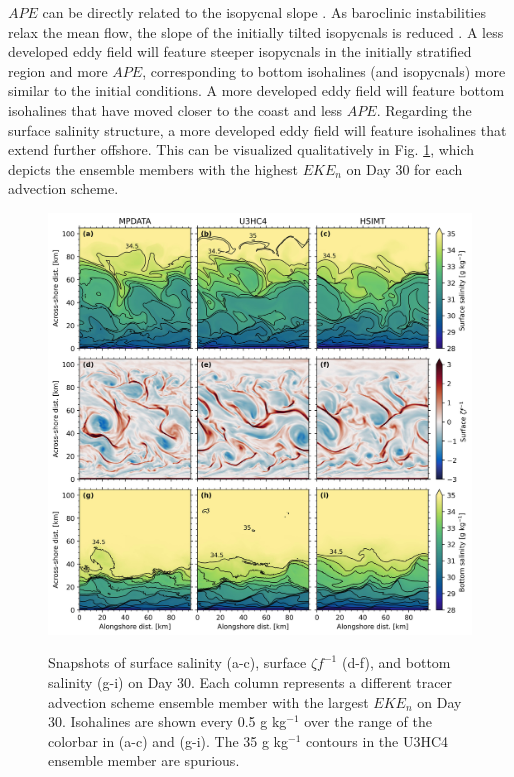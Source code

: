$APE$ can be directly related to the isopycnal slope \citep{brink2016continental1, brink2016continental2}. As baroclinic instabilities relax the mean flow, the slope of the initially tilted isopycnals is reduced \citep{Hetland_2017, zhang2018study}. A less developed eddy field will feature steeper isopycnals in the initially stratified region and more $APE$, corresponding to bottom isohalines (and isopycnals) more similar to the initial conditions. A more developed eddy field will feature bottom isohalines that have moved closer to the coast and less $APE$. Regarding the surface salinity structure, a more developed eddy field will feature isohalines that extend further offshore. This can be visualized qualitatively in Fig. \ref{fig:isohalines}, which depicts the ensemble members with the highest $EKE_n$ on Day 30 for each advection scheme.
\begin{figure}[t!]
    \begin{center}
    \includegraphics[width = 0.9\linewidth]{figures/shelfstrat_2024/shelf_dx_500_tadv_dt_30_day_30.jpg}\\
    \caption{Snapshots of surface salinity (a-c), surface $\zeta f^{-1}$ (d-f), and bottom salinity (g-i) on Day 30. Each column represents a different tracer advection scheme ensemble member with the largest $EKE_n$ on Day 30. Isohalines are shown every 0.5 g kg$^{-1}$ over the range of the colorbar in (a-c) and (g-i). The 35 g kg$^{-1}$ contours in the U3HC4 ensemble member are spurious.} \label{fig:isohalines}
     \end{center} 
\end{figure}

